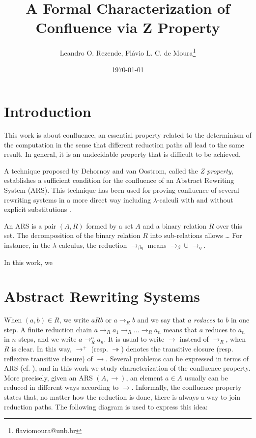 \documentclass[11pt]{article}
\author{Leandro O. Rezende, Flávio L. C. de Moura\thanks{flaviomoura@unb.br}}
\date{\today}
\title{A Formal Characterization of Confluence via Z Property}
\newcommand{\tto}{\twoheadrightarrow}
\begin{document}
\maketitle

\section{Introduction}
\label{sec:org82831c6}

This work is about confluence, an essential property related to the
determinism of the computation in the sense that different reduction
paths all lead to the same result. In general, it is an undecidable
property that is difficult to be achieved.

A technique proposed by Dehornoy and van Oostrom, called the \emph{Z
property}, establishes a sufficient condition for the confluence of an
Abstract Rewriting System (ARS). This technique has been used for
proving confluence of several rewriting systems in a more direct way
including \(\lambda\)-calculi with and without explicit substitutions
\cite{kes09,2016arXiv160903139N}.

An ARS is a pair \((A,R)\) formed by a set \(A\) and a binary relation
\(R\) over this set. The decomposition of the binary relation \(R\)
into sub-relations allows \ldots{} For instance, in the
\(\lambda\)-calculus, the reduction \(\to_{\beta\eta}\) means
\(\to_{\beta} \cup \to_{\eta}\).

In this work, we

\section{Abstract Rewriting Systems}
\label{sec:org7a3a72a}

 When \((a,b) \in R\),
we write \(a R b\) or \(a \to_R b\) and we say that \(a\) \emph{reduces} to
\(b\) in one step. A finite reduction chain \(a \to_R a_1 \to_R \ldots
\to_R a_n\) means that \(a\) reduces to \(a_n\) in \(n\) steps, and we
write \(a \to_R^n a_n\). It is usual to write \(\to\) instead of
\(\to_R\), when \(R\) is clear. In this way, \(\to^+\)
(resp. \(\tto\)) denotes the transitive closure (resp. reflexive
transitive closure) of \(\to\). Several problems can be expressed in
terms of ARS (cf. \cite{BN98,DershowitzJ90,terese03}), and in this work
we study characterization of the confluence property. More precisely,
given an ARS \((A,\to)\), an element \(a\in A\) usually can be reduced
in different ways according to \(\to\). Informally, the confluence
property states that, no matter how the reduction is done, there is
always a way to join reduction paths. The following diagram is used to
express this idea:
\end{document}

